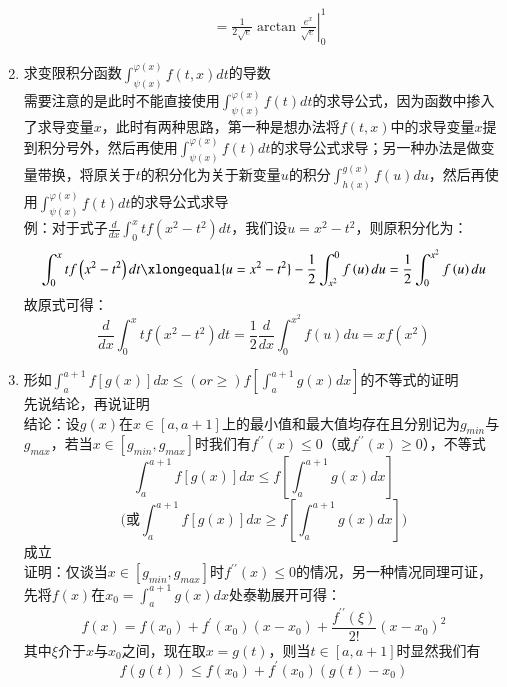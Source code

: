 \documentclass[12pt,a4paper,UTF8]{book}
\begin{document}
\begin{enumerate}
\[\begin{aligned}
&=\left.\frac{1}{2\sqrt{e}}\arctan\frac{e^x}{\sqrt{e}}\right|_0^1
\end{aligned}\]
\item 求变限积分函数$\int_{\psi\left(x\right)}^{\varphi\left(x\right)}f\left(t,x\right)dt$的导数\\
需要注意的是此时不能直接使用$\int_{\psi\left(x\right)}^{\varphi\left(x\right)}f\left(t\right)dt$的求导公式，因为函数中掺入了求导变量$x$，此时有两种思路，第一种是想办法将$f\left(t,x\right)$中的求导变量$x$提到积分号外，然后再使用$\int_{\psi\left(x\right)}^{\varphi\left(x\right)}f\left(t\right)dt$的求导公式求导；另一种办法是做变量带换，将原关于$t$的积分化为关于新变量$u$的积分$\int_{h\left(x\right)}^{g\left(x\right)}f\left(u\right)du$，然后再使用$\int_{\psi\left(x\right)}^{\varphi\left(x\right)}f\left(t\right)dt$的求导公式求导\\
例：对于式子$\frac{d}{dx}\int_{0}^{x}tf\left(x^2-t^2\right)dt$，我们设$u=x^2-t^2$，则原积分化为：
\[\int_{0}^{x}tf\left(x^2-t^2\right)dt\xlongequal{u=x^2-t^2}-\frac{1}{2}\int_{x^2}^{0}f\left(u\right)du=\frac{1}{2}\int_{0}^{x^2}f\left(u\right)du\]
故原式可得：
\[\frac{d}{dx}\int_{0}^{x}tf\left(x^2-t^2\right)dt=\frac{1}{2}\frac{d}{dx}\int_{0}^{x^2}f\left(u\right)du=xf\left(x^2\right)\]
\item 形如$\int_{a}^{a+1}f\left[g\left(x\right)\right]dx\leq\left(or\ge\right)f\left[\int_{a}^{a+1}g\left(x\right)dx\right]$的不等式的证明\\
\normalsize 先说结论，再说证明\\
结论：设$g\left(x\right)$在$x\in\left[a,a+1\right]$上的最小值和最大值均存在且分别记为$g_{min}$与$g_{max}$，若当$x\in\left[g_{min},g_{max}\right]$时我们有$f^{\prime\prime}\left(x\right)\leq 0$（或$f^{\prime\prime}\left(x\right)\ge 0$），不等式
\[\int_{a}^{a+1}f\left[g\left(x\right)\right]dx\leq f\left[\int_{a}^{a+1}g\left(x\right)dx\right]\]
\[\text{(或}\int_{a}^{a+1}f\left[g\left(x\right)\right]dx\ge f\left[\int_{a}^{a+1}g\left(x\right)dx\right]\text{)}\]
成立\\
证明：仅谈当$x\in\left[g_{min},g_{max}\right]$时$f^{\prime\prime}\left(x\right)\leq 0$的情况，另一种情况同理可证，先将$f\left(x\right)$在$x_0=\int_{a}^{a+1}g\left(x\right)dx$处泰勒展开可得：
\[f\left(x\right)=f\left(x_0\right)+f^{\prime}\left(x_0\right)\left(x-x_0\right)+\frac{f^{\prime\prime}\left(\xi\right)}{2!}\left(x-x_0\right)^2\]
其中$\xi$介于$x$与$x_0$之间，现在取$x=g\left(t\right)$，则当$t\in\left[a,a+1\right]$时显然我们有
\[f\left(g\left(t\right)\right)\leq f\left(x_0\right)+f^{\prime}\left(x_0\right)\left(g\left(t\right)-x_0\right)\]

\end{enumerate}
\end{document}
